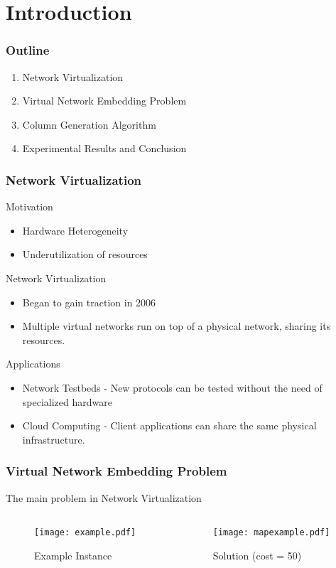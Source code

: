 \documentclass[english]{beamer}
\begin{document}
\section{Introduction}
\begin{frame}
  \frametitle{Outline}
\begin{enumerate}
  \item Network Virtualization
  \item Virtual Network Embedding Problem
    \item Column Generation Algorithm
  \item Experimental Results and Conclusion
\end{enumerate}
\end{frame}
\begin{frame}
  \frametitle{Network Virtualization}
Motivation
\begin{itemize}
  \item Hardware Heterogeneity
  \item Underutilization of resources
\end{itemize}
Network Virtualization
\begin{itemize}
  \item Began to gain traction in 2006
  \item Multiple virtual networks run on top of a physical network, sharing its resources.
\end{itemize}
Applications
\begin{itemize}
	\item Network Testbeds - New protocols can be tested without the need of 
     specialized hardware
	\item Cloud Computing - Client applications can share the same physical
      infrastructure.
\end{itemize}
\end{frame}
\begin{frame}
\frametitle{Virtual Network Embedding Problem}
The main problem in Network Virtualization
\begin{columns}
\begin{column}{0.5\textwidth}
  \begin{figure}
    \centering
    \texttt{[image: example.pdf]}
    \caption{Example Instance}
  \end{figure}
\end{column}
\begin{column}{0.5\textwidth}
  \begin{figure}
    \centering
    \texttt{[image: mapexample.pdf]}
    \caption{Solution (cost = 50)}
  \end{figure}
\end{column}
\end{columns}
\end{frame}
\end{document}
